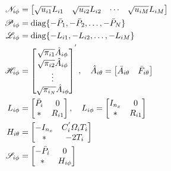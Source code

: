 \documentclass[conference]{IEEEtran}
\begin{document}
\begin{equation}\notag
	\begin{aligned}
	\mathscr{N}_{i\phi}&=\begin{bmatrix}
	\sqrt{u_{i1}}L_{i1}&\sqrt{u_{i2}}L_{i2}&\cdots&\sqrt{u_{iM}}L_{iM}
	\end{bmatrix}\\
	\mathscr{P}_{i\phi}&=\mathrm{diag} \{-\bar{P}_{1},-\bar{P}_{2},\dots,-\bar{P}_{N}  \}\\
	\mathscr{L}_{i\phi}&=\mathrm{diag} \{-L_{i1},-L_{i2},\dots,-L_{iM}  \}\\
		\mathscr{H}_{i\phi}&=\begin{bmatrix}
			\sqrt{\pi_{i1}}\hat{A}_{i\phi}\\
			\sqrt{\pi_{i2}}\hat{A}_{i\phi}\\
			\vdots\\
			\sqrt{\pi_{i_N}}\hat{A}_{i\phi}
		\end{bmatrix}^{'}, \quad
		\hat{A}_{i\theta}=\begin{bmatrix}
		\bar{A}_{i\theta}&\bar{F}_{i\theta}
		\end{bmatrix}  \\
		L_{i\phi}&=\begin{bmatrix}
		\bar{P}_{i}&0\\
		*&R_{i1}
		\end{bmatrix}, \quad
		L_{i\phi}=\begin{bmatrix}
		I_{n_x}&0\\
		*&R_{i1}
		\end{bmatrix}\\
		H_{i\theta}&=\begin{bmatrix}
			-I_{n_x}&C^{'}_{i}\varOmega_{i}T_{i} \\
			*&-2T_{i}
		\end{bmatrix}\\
		\mathscr{S}_{i\phi}&= \begin{bmatrix}
			-\bar{P}_{i}&0\\
			*&H_{i\phi}
		\end{bmatrix}\\
	\end{aligned}
\end{equation}
\end{document}
